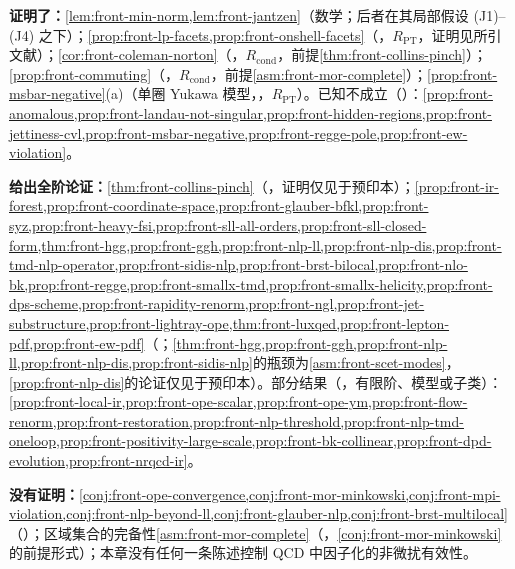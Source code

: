 \begin{tcolorbox}[enhanced,breakable,title=本章证明了什么／没有证明什么,fonttitle=\bfseries,
  colback=gray!3!white,colframe=gray!55!black,boxrule=0.6pt,arc=2pt,
  left=5pt,right=5pt,top=3pt,bottom=3pt,before skip=6pt,after skip=6pt]
\textbf{证明了：}\cref{lem:front-min-norm,lem:front-jantzen}（数学；后者在其局部假设 (J1)--(J4) 之下）；\cref{prop:front-lp-facets,prop:front-onshell-facets}（\tagR，$R_{\mathrm{PT}}$，证明见所引文献）；\cref{cor:front-coleman-norton}（\tagR，$R_{\mathrm{cond}}$，前提\cref{thm:front-collins-pinch}）；\cref{prop:front-commuting}（\tagR，$R_{\mathrm{cond}}$，前提\cref{asm:front-mor-complete}）；\cref{prop:front-msbar-negative}(a)（单圈 Yukawa 模型，\tagR，$R_{\mathrm{PT}}$）。已知不成立（\tagV）：\cref{prop:front-anomalous,prop:front-landau-not-singular,prop:front-hidden-regions,prop:front-jettiness-cvl,prop:front-msbar-negative,prop:front-regge-pole,prop:front-ew-violation}。\par
\textbf{给出全阶论证：}\cref{thm:front-collins-pinch}（\tagA，证明仅见于预印本）；\cref{prop:front-ir-forest,prop:front-coordinate-space,prop:front-glauber-bfkl,prop:front-syz,prop:front-heavy-fsi,prop:front-sll-all-orders,prop:front-sll-closed-form,thm:front-hgg,prop:front-ggh,prop:front-nlp-ll,prop:front-nlp-dis,prop:front-tmd-nlp-operator,prop:front-sidis-nlp,prop:front-brst-bilocal,prop:front-nlo-bk,prop:front-regge,prop:front-smallx-tmd,prop:front-smallx-helicity,prop:front-dps-scheme,prop:front-rapidity-renorm,prop:front-ngl,prop:front-jet-substructure,prop:front-lightray-ope,thm:front-luxqed,prop:front-lepton-pdf,prop:front-ew-pdf}（\tagA；\cref{thm:front-hgg,prop:front-ggh,prop:front-nlp-ll,prop:front-nlp-dis,prop:front-sidis-nlp}的瓶颈为\cref{asm:front-scet-modes}，\cref{prop:front-nlp-dis}的论证仅见于预印本）。部分结果（\tagP，有限阶、模型或子类）：\cref{prop:front-local-ir,prop:front-ope-scalar,prop:front-ope-ym,prop:front-flow-renorm,prop:front-restoration,prop:front-nlp-threshold,prop:front-nlp-tmd-oneloop,prop:front-positivity-large-scale,prop:front-bk-collinear,prop:front-dpd-evolution,prop:front-nrqcd-ir}。\par
\textbf{没有证明：}\cref{conj:front-ope-convergence,conj:front-mor-minkowski,conj:front-mpi-violation,conj:front-nlp-beyond-ll,conj:front-glauber-nlp,conj:front-brst-multilocal}（\tagC）；区域集合的完备性\cref{asm:front-mor-complete}（\tagC，\cref{conj:front-mor-minkowski}的前提形式）；本章没有任何一条陈述控制 QCD 中因子化的非微扰有效性。
\end{tcolorbox}

